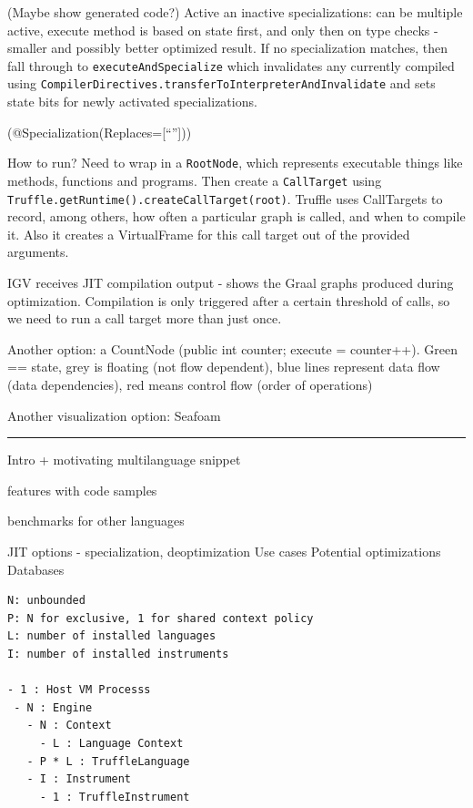 \documentclass[english,zadani,odsaz]{fitthesis}
\begin{document}
(Maybe show generated code?) Active an inactive specializations: can be multiple
active, execute method is based on state first, and only then on type checks -
smaller and possibly better optimized result. If no specialization matches, then
fall through to \texttt{executeAndSpecialize} which invalidates any currently compiled
using \texttt{CompilerDirectives.transferToInterpreterAndInvalidate} and sets state bits
for newly activated specializations.

(@Specialization(Replaces=[``'']))


How to run? Need to wrap in a \texttt{RootNode}, which represents executable things like
methods, functions and programs. Then create a \texttt{CallTarget} using
\texttt{Truffle.getRuntime().createCallTarget(root)}. Truffle uses CallTargets to record,
among others, how often a particular graph is called, and when to compile
it. Also it creates a VirtualFrame for this call target out of the provided
arguments.

IGV receives JIT compilation output - shows the Graal graphs produced during
optimization. Compilation is only triggered after a certain threshold of calls,
so we need to run a call target more than just once.



Another option: a CountNode (public int counter; execute = counter++). Green ==
state, grey is floating (not flow dependent), blue lines represent data flow
(data dependencies), red means control flow (order of operations)

Another visualization option: Seafoam

\noindent\rule{\textwidth}{0.5pt}

Intro + motivating multilanguage snippet


features with code samples

benchmarks for other languages

JIT options - specialization, deoptimization
Use cases
Potential optimizations
Databases

\begin{verbatim}
N: unbounded
P: N for exclusive, 1 for shared context policy
L: number of installed languages
I: number of installed instruments

- 1 : Host VM Processs
 - N : Engine
   - N : Context
     - L : Language Context
   - P * L : TruffleLanguage
   - I : Instrument
     - 1 : TruffleInstrument
\end{verbatim}
\end{document}
